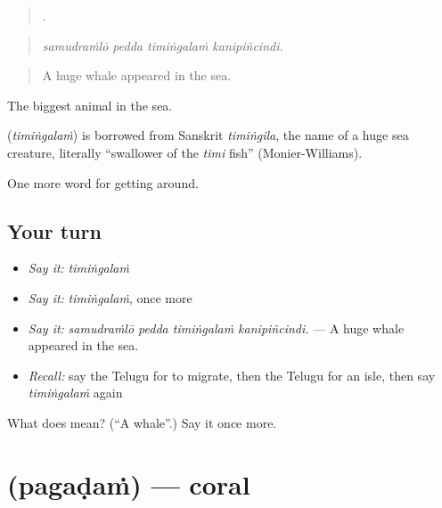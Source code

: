 \begin{quote}
   .
\end{quote}

\begin{quote}
\emph{samudraṁlō pedda timiṅgalaṁ kanipiñcindi.}
\end{quote}

\begin{quote}
A huge whale appeared in the sea.
\end{quote}

The biggest animal in the sea.

\begin{cousinweb}
\textbf{} (\emph{timiṅgalaṁ}) is borrowed from Sanskrit \emph{timiṅgila}, the name of a huge sea creature, literally \textquotedblleft{}swallower of the \emph{timi} fish\textquotedblright{} (Monier-Williams).
\end{cousinweb}

\begin{grammarlens}[title={What you've built}]
One more word for getting around.
\end{grammarlens}

\subsection*{Your turn}
\begin{itemize}
\raggedright
  \item \emph{Say it:} \emph{timiṅgalaṁ}
  \item \emph{Say it:} \emph{timiṅgalaṁ}, once more
  \item \emph{Say it:} \emph{samudraṁlō pedda timiṅgalaṁ kanipiñcindi.} — A huge whale appeared in the sea.
  \item \emph{Recall:} say the Telugu for to migrate, then the Telugu for an isle, then say \emph{timiṅgalaṁ} again
\end{itemize}

\begin{tcolorbox}[breakable,colback=teal!4,colframe=teal!35!black,title={Before you move on}]
What does  mean? (\textquotedblleft{}A whale\textquotedblright{}.) Say it once more.
\end{tcolorbox}
\section[\texorpdfstring{\te{పగడం} (pagaḍaṁ)}{పగడం (pagaḍaṁ)}]{ (pagaḍaṁ) — coral}


